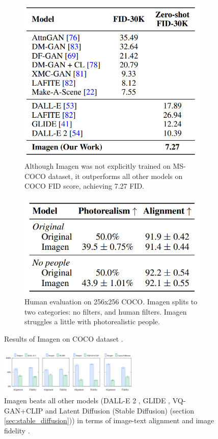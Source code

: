 \begin{figure}[t!]
    \centering
    \begin{subfigure}{0.48\textwidth}
        \centering
        \includegraphics[width=0.6\linewidth]{images/imagen/imagen_coco_zeroshot.png}
        \caption{Although Imagen was not explicitly trained on MS-COCO dataset, it outperforms all other models on COCO FID score, achieving 7.27 FID.}
        \label{fig:imagen_coco_zeroshot}
    \end{subfigure}
    \hfill
    \begin{subfigure}{0.48\textwidth}
        \centering
        \includegraphics[width=0.6\linewidth]{images/imagen/imagen_coco_human_eval.png}
        \caption{Human evaluation on 256x256 COCO. Imagen splits to two categories: no filters, and human filters. Imagen struggles a little with photorealistic people.}
        \label{fig:imagen_coco_human_eval}
    \end{subfigure}
    \caption{Results of Imagen on COCO dataset \cite{imagen}.}
\end{figure}

\begin{figure}
    \centering
    \includegraphics[width=0.6\textwidth]{images/imagen/alignment_fidelity_imagen_vs_models.png}
    \caption{Imagen beats all other models (DALL-E 2 \cite{dalle_2}, GLIDE \cite{glide}, VQ-GAN+CLIP \cite{vqgan_clip} and Latent Diffusion (Stable Diffusion) \cite{stable_diffusion} (section \ref{sec:stable_diffusion})) in terms of image-text alignment and image fidelity \cite{imagen}.}
    \label{fig:imagen_alignment_fidelity_vs_other_models}
\end{figure}

